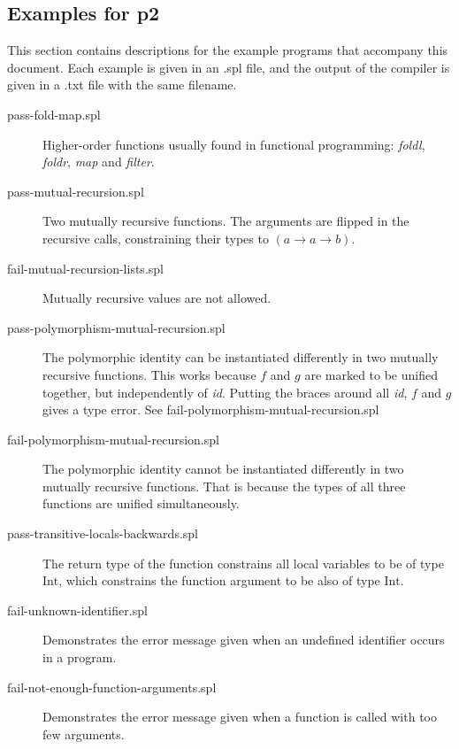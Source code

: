 \documentclass[a4paper]{article}
\newcommand{\arr}{\rightarrow}
\begin{document}
\subsection{Examples for p2}

This section contains descriptions for the example programs that accompany this
document.  Each example is given in an .spl file, and the output of the compiler
is given in a .txt file with the same filename.

\begin{description}

  \item[pass-fold-map.spl] Higher-order functions usually found in functional
  programming: \emph{foldl}, \emph{foldr}, \emph{map} and \emph{filter}.

  \item[pass-mutual-recursion.spl] Two mutually recursive functions. The
  arguments are flipped in the recursive calls, constraining their types to $(a
  \arr a \arr b)$.

  \item[fail-mutual-recursion-lists.spl] Mutually recursive values are not
  allowed.

  \item[pass-polymorphism-mutual-recursion.spl] The polymorphic identity can be
  instantiated differently in two mutually recursive functions.  This works
  because $f$ and $g$ are marked to be unified together, but independently of
  \emph{id}.  Putting the braces around all \emph{id}, $f$ and $g$ gives a type
  error.  See fail-polymorphism-mutual-recursion.spl

  \item[fail-polymorphism-mutual-recursion.spl] The polymorphic identity cannot
  be instantiated differently in two mutually recursive functions.  That is
  because the types of all three functions are unified simultaneously.

  \item[pass-transitive-locals-backwards.spl] The return type of the function
  constrains all local variables to be of type $\text{Int}$, which constrains
  the function argument to be also of type $\text{Int}$.

  \item[fail-unknown-identifier.spl] Demonstrates the error message given when
  an undefined identifier occurs in a program.

  \item[fail-not-enough-function-arguments.spl] Demonstrates the error message
  given when a function is called with too few arguments.


\end{description}
\end{document}

